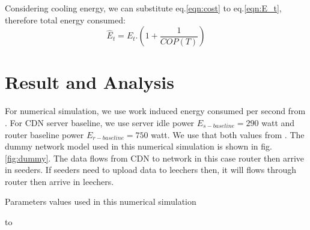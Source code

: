 \documentclass[JIP]{ipsj}
\begin{document}
Considering cooling energy, we can substitute eq.\ref{eqn:cost} to eq.\ref{eqn:E_t}, therefore total energy consumed: 
\begin{equation}
	\hat{E}_{t} = E_{t}.\left( 1+\frac{1}{COP(T)} \right)
\end{equation}




\section{Result and Analysis}\label{analysis}

For numerical simulation, we use work induced energy consumed per second from \cite{Nedevschi:2008:HDC:1855610.1855618}.
For CDN server baseline, we use server idle power $E_{s-baseline}=290$ watt and router baseline power $E_{r-baseline}=750$ watt. 
We use that both values from \cite{Nedevschi:2008:HDC:1855610.1855618}.
The dummy network model used in this numerical simulation is shown in fig.\ref{fig:dummy}.
The data flows from CDN to network in this case router then arrive in seeders. 
If seeders need to upload data to leechers then, it will flows through router then arrive in leechers. 

Parameters values used in this numerical simulation
\begin{table}[thb]
\caption{Numerical Simulation Parameters.}
\label{tab:simparameters}
\hbox to
\end{table}
\end{document}

